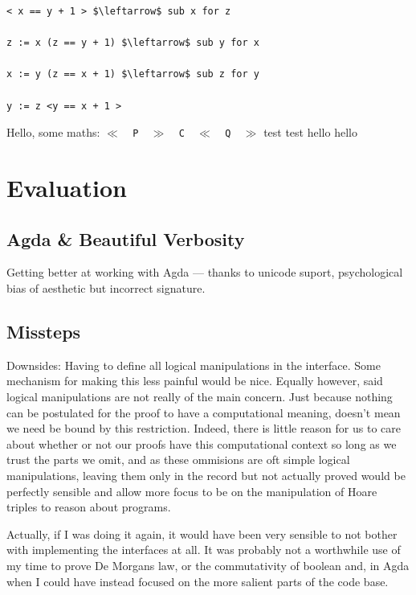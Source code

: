 \documentclass[oneside,12pt]{article}
\begin{document}
\begin{verbatim}
< x == y + 1 > $\leftarrow$ sub x for z
  
z := x (z == y + 1) $\leftarrow$ sub y for x

x := y (z == x + 1) $\leftarrow$ sub z for y

y := z <y == x + 1 >

\end{verbatim}


Hello, some maths: \texttt{$\ll$\!\,\,P\,\,\!$\gg$\!\,\,C\,\,\!$\ll$\!\,\,Q\,\,\!$\gg$} test test hello hello
 
\section{Evaluation}


\subsection{Agda \& Beautiful Verbosity}

Getting better at working with Agda --- thanks to unicode suport, psychological bias of aesthetic but incorrect signature.


\subsection{Missteps}


Downsides: Having to define all logical manipulations in the interface. Some mechanism for making this less painful would be nice. Equally however, said logical manipulations are not really of the main concern. Just because nothing can be postulated for the proof to have a computational meaning, doesn't mean we need be bound by this restriction. Indeed, there is little reason for us to care about whether or not our proofs have this computational context so long as we trust the parts we omit, and as these ommisions are oft simple logical manipulations, leaving them only in the record but not actually proved would be perfectly sensible and allow more focus to be on the manipulation of Hoare triples to reason about programs.

Actually, if I was doing it again, it would have been very sensible to not bother with implementing the interfaces at all. It was probably not a worthwhile use of my time to prove De Morgans law, or the commutativity of boolean and, in Agda when I could have instead focused on the more salient parts of the code base.
\end{document}
